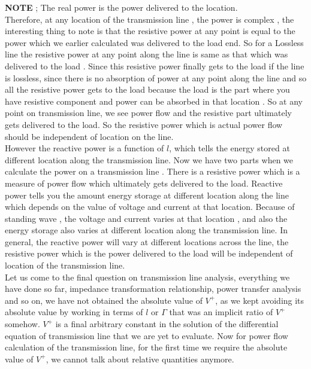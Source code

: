\textbf{NOTE} ; The real power is the power delivered to the location.\\   
Therefore, at any location of the transmission line , the power is complex , the interesting thing to note is that the resistive power at any point is equal to the power which we earlier calculated was delivered to the load end. So for a Lossless line the resistive power at any point along the line is same as that which was delivered to the load . Since  this resistive power finally gets to the load if the line is lossless, since there is no absorption of power at any point along the line and so all the resistive power gets to the load because the load is the part where you have resistive component and power can be  absorbed in that location . So at any point on transmission line, we see power flow and the resistive part ultimately gets delivered to the load.  So the resistive power which is actual power flow should be independent of location on the line.\\
However the reactive power is a function of $l$, which tells the energy stored at different location along the transmission line. Now we have two parts when we calculate the power on a transmission line . There is a resistive power which is a measure of power flow which ultimately gets delivered to the load. Reactive power tells you the amount energy storage at different location along the line which depends on the value of voltage and current at that location. Because of standing wave , the voltage and current varies at that location , and also the energy storage also varies at different location along the transmission line. In general, the reactive power will vary at different locations across the line, the resistive power which is the power delivered to the load will be independent of location of the transmission line.\\
Let us come to the final question on transmission line analysis, everything we have done so far, impedance transformation relationship, power transfer analysis and so on, we have not obtained the absolute value of $V^+$, as we kept avoiding its absolute value by working in terms of $l$ or $\Gamma$ that was an implicit ratio of $V^+$ somehow. $V^+$ is a final arbitrary constant in the solution of the differential equation of transmission line that we are yet to evaluate. Now for power flow calculation of the transmission line, for the first time we require the absolute value of $V^+$, we cannot talk about relative quantities anymore.

